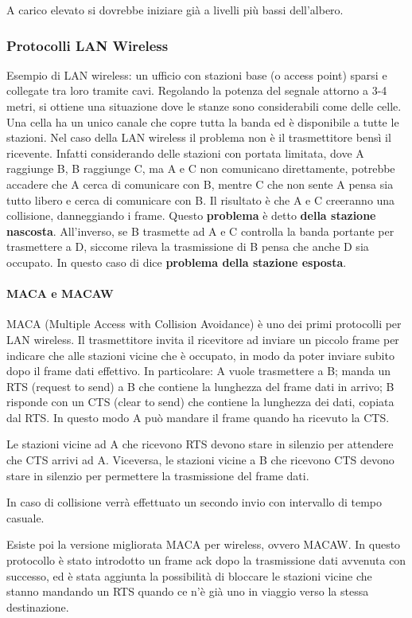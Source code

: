 A carico elevato si dovrebbe iniziare già a livelli più bassi dell'albero.

\subsubsection{Protocolli LAN Wireless}
Esempio di LAN wireless: un ufficio con stazioni base (o access point) sparsi e collegate tra loro tramite cavi.
Regolando la potenza del segnale attorno a 3-4 metri, si ottiene una situazione dove le stanze sono considerabili come delle celle.
Una cella ha un unico canale che copre tutta la banda ed è disponibile a tutte le stazioni.
Nel caso della LAN wireless il problema non è il trasmettitore bensì il ricevente.
Infatti considerando delle stazioni con portata limitata, dove A raggiunge B, B raggiunge C, ma A e C non comunicano direttamente,
potrebbe accadere che A cerca di comunicare con B, mentre C che non sente A pensa sia tutto libero e cerca di comunicare con B. 
Il risultato è che A e C creeranno una collisione, danneggiando i frame.
Questo \textbf{problema} è detto \textbf{della stazione nascosta}.
All'inverso, se B trasmette ad A e C controlla la banda portante per trasmettere a D, siccome rileva la trasmissione di B pensa che anche D sia occupato.
In questo caso di dice \textbf{problema della stazione esposta}. 

\paragraph{MACA e MACAW}
MACA (Multiple Access with Collision Avoidance) è uno dei primi protocolli per LAN wireless.
Il trasmettitore invita il ricevitore ad inviare un piccolo frame per indicare che alle stazioni vicine che è occupato, 
in modo da poter inviare subito dopo il frame dati effettivo.
In particolare:
A vuole trasmettere a B; manda un RTS (request to send) a B che contiene la lunghezza del frame dati in arrivo;
B risponde con un CTS (clear to send) che contiene la lunghezza dei dati, copiata dal RTS.
In questo modo A può mandare il frame quando ha ricevuto la CTS.

Le stazioni vicine ad A che ricevono RTS devono stare in silenzio per attendere che CTS arrivi ad A.
Viceversa, le stazioni vicine a B che ricevono CTS devono stare in silenzio per permettere la trasmissione del frame dati.

In caso di collisione verrà effettuato un secondo invio con intervallo di tempo casuale.

Esiste poi la versione migliorata MACA per wireless, ovvero MACAW.
In questo protocollo è stato introdotto un frame ack dopo la trasmissione dati avvenuta con successo,
ed è stata aggiunta la possibilità di bloccare le stazioni vicine che stanno mandando un RTS quando ce n'è già uno in viaggio verso la stessa destinazione.

